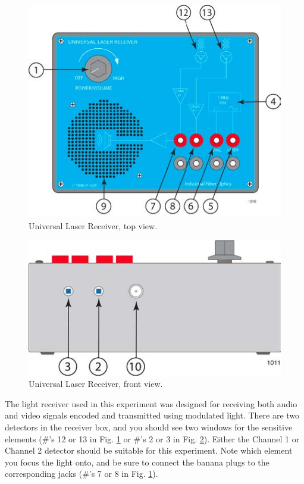 \documentclass{tufte-handout}
\begin{document}
\begin{figure}
\centering
\includegraphics{../images/if-lsl-sa1opman-revd.jpg}
\caption{Universal Laser Receiver, top view.}
\label{ULRtop}
\end{figure}

\begin{figure}
\centering
\includegraphics{../images/if-lsl-sa1opman-revdfront.jpg}
\caption{Universal Laser Receiver, front view.}
\label{ULRfront}
\end{figure}

The light receiver used in this experiment was designed for receiving both audio and video signals encoded and transmitted using modulated light.  There are two detectors in the receiver box, and you should see two windows for the sensitive elements (\#'s 12 or 13 in Fig. \ref{ULRtop} or \#'s 2 or 3 in Fig. \ref{ULRfront}).
Either the Channel 1 or Channel 2 detector should be suitable for this experiment.  Note which element you focus the light onto, and be sure to connect the banana plugs to the corresponding jacks (\#'s 7 or 8 in Fig. \ref{ULRtop}).   
\end{document}
